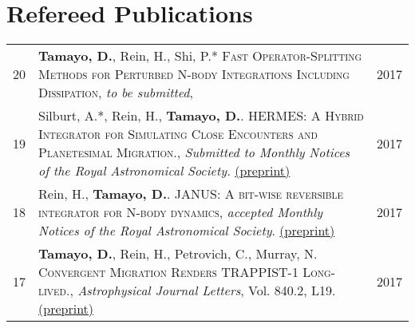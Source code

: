\documentclass[10pt]{article} %
\begin{document}
{%



\section{Refereed Publications}

\begin{tabular}{>{\hfill}r|p{14.3cm}l}
20 & {\bf Tamayo, D.}, Rein, H., Shi, P.* \textsc{Fast Operator-Splitting Methods for Perturbed N-body Integrations Including Dissipation}, {\it to be submitted}, & 2017 \\

19 & Silburt, A.*, Rein, H., {\bf Tamayo, D.}. \textsc{HERMES: A Hybrid Integrator for Simulating Close Encounters and Planetesimal Migration.}, {\it Submitted to Monthly Notices of the Royal Astronomical Society.} \href{http://cita.utoronto.ca/~dtamayo/hermes.pdf}{(preprint)} & 2017 \\

18 & Rein, H., {\bf Tamayo, D.}. \textsc{JANUS: A bit-wise reversible integrator for N-body dynamics}, {\it accepted Monthly Notices of the Royal Astronomical Society}. \href{https://arxiv.org/abs/1704.07715}{(preprint)} & 2017 \\

17 & {\bf Tamayo, D.}, Rein, H., Petrovich, C., Murray, N. \textsc{Convergent Migration Renders TRAPPIST-1 Long-lived.}, {\it Astrophysical Journal Letters}, Vol. 840.2, L19. \href{https://arxiv.org/abs/1704.02957}{(preprint)} & 2017 \\


\end{tabular}}
\end{document}
